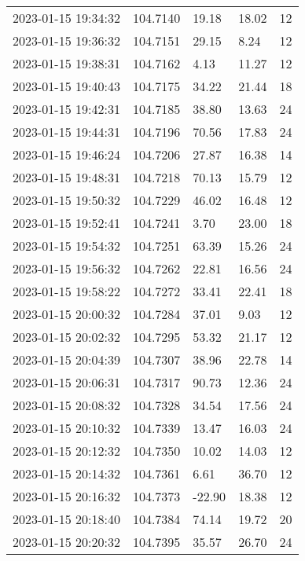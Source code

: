 \documentclass{nature_plusfigure}
\begin{document}
\begin{supplement}
\begin{center}
\begin{longtable}{lllll}
2023-01-15 19:34:32 & 104.7140 & 19.18 & 18.02 & 12 \\ 
2023-01-15 19:36:32 & 104.7151 & 29.15 & 8.24 & 12 \\ 
2023-01-15 19:38:31 & 104.7162 & 4.13 & 11.27 & 12 \\ 
2023-01-15 19:40:43 & 104.7175 & 34.22 & 21.44 & 18 \\ 
2023-01-15 19:42:31 & 104.7185 & 38.80 & 13.63 & 24 \\ 
2023-01-15 19:44:31 & 104.7196 & 70.56 & 17.83 & 24 \\ 
2023-01-15 19:46:24 & 104.7206 & 27.87 & 16.38 & 14 \\ 
2023-01-15 19:48:31 & 104.7218 & 70.13 & 15.79 & 12 \\ 
2023-01-15 19:50:32 & 104.7229 & 46.02 & 16.48 & 12 \\ 
2023-01-15 19:52:41 & 104.7241 & 3.70 & 23.00 & 18 \\ 
2023-01-15 19:54:32 & 104.7251 & 63.39 & 15.26 & 24 \\ 
2023-01-15 19:56:32 & 104.7262 & 22.81 & 16.56 & 24 \\ 
2023-01-15 19:58:22 & 104.7272 & 33.41 & 22.41 & 18 \\ 
2023-01-15 20:00:32 & 104.7284 & 37.01 & 9.03 & 12 \\ 
2023-01-15 20:02:32 & 104.7295 & 53.32 & 21.17 & 12 \\ 
2023-01-15 20:04:39 & 104.7307 & 38.96 & 22.78 & 14 \\ 
2023-01-15 20:06:31 & 104.7317 & 90.73 & 12.36 & 24 \\ 
2023-01-15 20:08:32 & 104.7328 & 34.54 & 17.56 & 24 \\ 
2023-01-15 20:10:32 & 104.7339 & 13.47 & 16.03 & 24 \\ 
2023-01-15 20:12:32 & 104.7350 & 10.02 & 14.03 & 12 \\ 
2023-01-15 20:14:32 & 104.7361 & 6.61 & 36.70 & 12 \\ 
2023-01-15 20:16:32 & 104.7373 & -22.90 & 18.38 & 12 \\ 
2023-01-15 20:18:40 & 104.7384 & 74.14 & 19.72 & 20 \\ 
2023-01-15 20:20:32 & 104.7395 & 35.57 & 26.70 & 24 \\ 
\hline 
\end{longtable} 
\end{center} 



\end{supplement}
\end{document}
